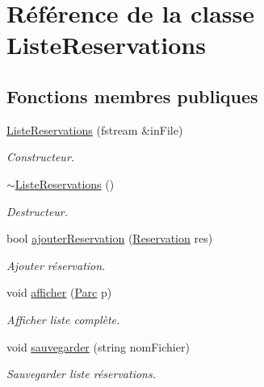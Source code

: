 \hypertarget{class_liste_reservations}{
\section{Référence de la classe ListeReservations}
\label{class_liste_reservations}
}
\subsection*{Fonctions membres publiques}
\begin{DoxyCompactItemize}
\item 
\hyperlink{class_liste_reservations_a588814a2a1a844ad70e790d1cf7f3d45}{ListeReservations} (fstream \&inFile)
\begin{DoxyCompactList}\small\item\em Constructeur. \item\end{DoxyCompactList}\item 
\hyperlink{class_liste_reservations_a32f73522c4b7e1dc98dc6ed8a06e7ec6}{$\sim$ListeReservations} ()
\begin{DoxyCompactList}\small\item\em Destructeur. \item\end{DoxyCompactList}\item 
bool \hyperlink{class_liste_reservations_abc616def701c55e0643f7ace4e0dd0c5}{ajouterReservation} (\hyperlink{class_reservation}{Reservation} res)
\begin{DoxyCompactList}\small\item\em Ajouter réservation. \item\end{DoxyCompactList}\item 
void \hyperlink{class_liste_reservations_a6a199865ea417f472c46cd981bdb9e2c}{afficher} (\hyperlink{class_parc}{Parc} p)
\begin{DoxyCompactList}\small\item\em Afficher liste complète. \item\end{DoxyCompactList}\item 
void \hyperlink{class_liste_reservations_a0d55928f73787fe75e77df3fd79da52e}{sauvegarder} (string nomFichier)
\begin{DoxyCompactList}\small\item\em Sauvegarder liste réservations. \item\end{DoxyCompactList}\end{DoxyCompactItemize}


